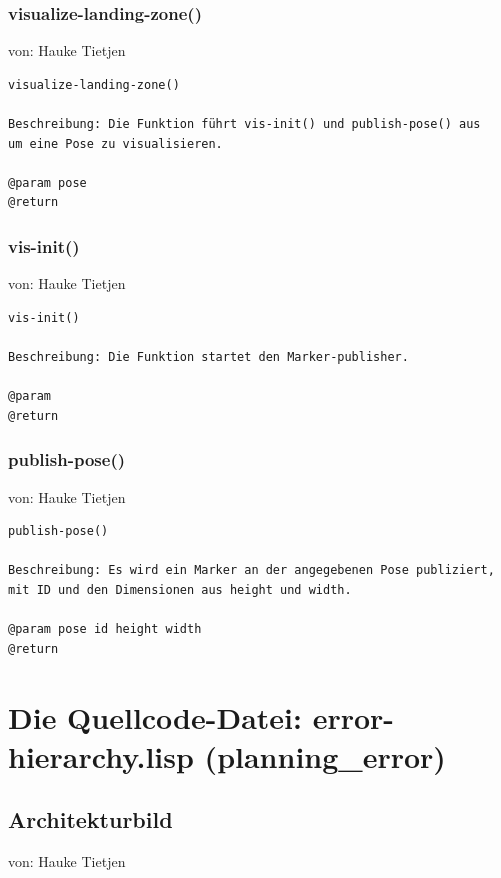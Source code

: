 \documentclass{suturo}
\makeatletter
\newcommand{\chapterauthor}[1]{%
  {\parindent0pt\vspace*{-27pt}%
  \linespread{0}\small\begin{flushright}von: #1\end{flushright}%
  \par\nobreak\vspace*{0pt}}
  \@afterheading%
}
\makeatother
\begin{document}
\subsubsection{visualize-landing-zone()}
\chapterauthor{Hauke Tietjen}
\begin{verbatim}
visualize-landing-zone()

Beschreibung: Die Funktion führt vis-init() und publish-pose() aus
um eine Pose zu visualisieren.

@param pose
@return 
\end{verbatim}

\subsubsection{vis-init()}
\chapterauthor{Hauke Tietjen}
\begin{verbatim}
vis-init()

Beschreibung: Die Funktion startet den Marker-publisher.

@param 
@return 
\end{verbatim}

\subsubsection{publish-pose()}
\chapterauthor{Hauke Tietjen}
\begin{verbatim}
publish-pose()

Beschreibung: Es wird ein Marker an der angegebenen Pose publiziert,
mit ID und den Dimensionen aus height und width.

@param pose id height width
@return 
\end{verbatim}

\section{Die Quellcode-Datei: error-hierarchy.lisp (planning\_error)}
\subsection{Architekturbild}
\chapterauthor{Hauke Tietjen}
\begin{figure}[!htb]
\end{figure}
\end{document}
